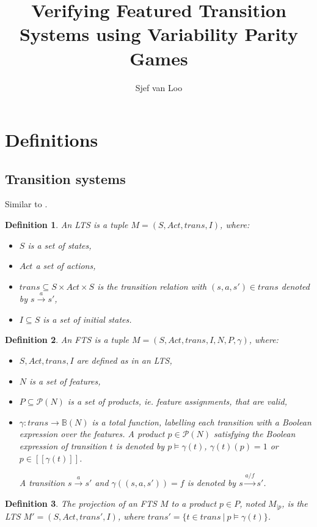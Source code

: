 \documentclass[]{article}
\title{Verifying Featured Transition Systems using Variability Parity Games}
\author{Sjef van Loo}
\newtheorem{definition}{Definition}[section]
\begin{document}
\maketitle

\section{Definitions}
\subsection{Transition systems}
Similar to \cite{Classen2013FeaturedTS}.

\begin{definition}An LTS is a tuple $M = (S, Act, trans, I)$, where:
	\begin{itemize}
		\item $S$ is a set of states,
		\item $Act$ a set of actions,
		\item $trans \subseteq S \times Act \times S$ is the transition relation with $(s,a,s') \in trans$ denoted by $s \xrightarrow a s'$,
		\item $I \subseteq S$ is a set of initial states.
	\end{itemize}
\end{definition}

\begin{definition}An FTS is a tuple $M = (S, Act, trans, I, N, P, \gamma)$, where:
	\begin{itemize}
		\item $S, Act, trans, I$ are defined as in an LTS,
		\item $N$ is a set of features,
		\item $P \subseteq \mathcal{P}(N)$ is a set of products, ie. feature assignments, that are valid,
		\item $\gamma : trans \rightarrow \mathbb{B}(N)$ is a total function, labelling each transition with a Boolean expression over the features. A product $p \in \mathcal{P}(N)$ satisfying the Boolean expression of transition $t$ is denoted by $p \models \gamma(t)$, $\gamma(t)(p) = 1$ or $p \in [\![\gamma(t)]\!]$. 
		
		A transition $s \xrightarrow a s'$ and $\gamma((s,a,s')) = f$ is denoted by $s \xrightarrow {a / f} s'$. 
	\end{itemize}
\end{definition}

\begin{definition}
	The projection of an FTS $M$ to a product $p \in P$, noted $M_{|p}$, is the LTS $M'=(S,Act,trans', I)$, where $trans' = \{t \in trans\ |\ p \models \gamma(t)\}$.
\end{definition}
\end{document}
